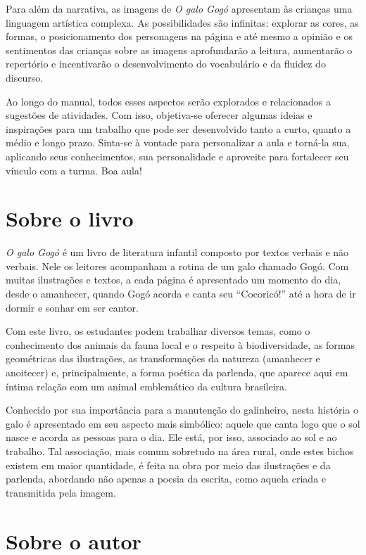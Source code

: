 \documentclass[11pt]{extarticle}
\begin{document}
Para além da narrativa, as imagens de \textit{O galo Gogó} 
apresentam às crianças uma linguagem artística complexa.
As possibilidades são infinitas: explorar as cores, as formas, o posicionamento dos personagens na página e até mesmo a opinião e os sentimentos das crianças sobre as imagens 
aprofundarão a leitura, aumentarão o repertório e incentivarão o desenvolvimento do vocabulário e da fluidez do discurso.

Ao longo do manual, todos esses aspectos serão explorados e relacionados a sugestões de atividades. Com isso, objetiva-se oferecer algumas ideias e inspirações para um trabalho que pode ser desenvolvido tanto a curto, quanto a médio e longo prazo. Sinta-se à vontade para personalizar a aula e torná-la sua, aplicando seus conhecimentos, sua 
personalidade e aproveite para fortalecer seu vínculo com a turma.
Boa aula!

\section{Sobre o livro}
\textit{O galo Gogó} é um livro de literatura infantil composto por textos 
verbais e não verbais. Nele os leitores acompanham a rotina de um galo chamado
Gogó. Com muitas ilustrações e textos, a cada página é
apresentado um momento do dia, desde o amanhecer, quando
Gogó acorda e canta seu ``Cocoricó!'' até a hora de ir dormir e sonhar
em ser cantor. 

Com este livro, os estudantes podem
trabalhar diversos temas, como o conhecimento dos
animais da fauna local e o respeito à biodiversidade, as formas geométricas das ilustrações,
as transformações da natureza (amanhecer e anoitecer) e, principalmente, a forma poética da parlenda, que aparece aqui em íntima relação com um animal emblemático da cultura brasileira.

Conhecido por sua importância para a manutenção do galinheiro, nesta história
o galo é apresentado em seu aspecto mais simbólico: aquele que canta logo
que o sol nasce e acorda as pessoas para o dia. Ele está, por isso, associado
ao sol e ao trabalho. Tal associação, mais comum sobretudo na área rural, onde estes bichos
existem em maior quantidade, é feita na obra por meio das ilustrações e da parlenda, abordando não apenas a poesia da escrita, como aquela criada e transmitida pela imagem.


\section{Sobre o autor}
\end{document}
